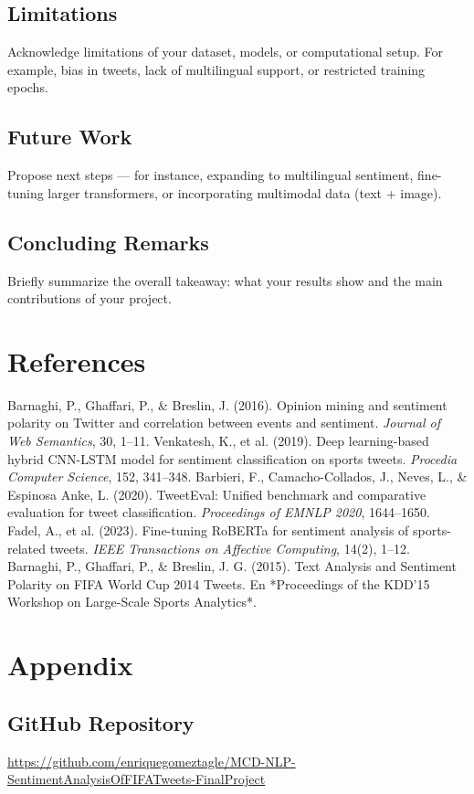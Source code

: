 \documentclass[10pt]{article}
\begin{document}
\subsection{Limitations} %
Acknowledge limitations of your dataset, models, or computational setup. For example, bias in tweets, lack of multilingual support, or restricted training epochs.

\subsection{Future Work}
Propose next steps — for instance, expanding to multilingual sentiment, fine-tuning larger transformers, or incorporating multimodal data (text + image).

\subsection{Concluding Remarks}
Briefly summarize the overall takeaway: what your results show and the main contributions of your project.

\section{References}
\begin{thebibliography}{9}
 Barnaghi, P., Ghaffari, P., \& Breslin, J. (2016). Opinion mining and sentiment polarity on Twitter and correlation between events and sentiment. \textit{Journal of Web Semantics}, 30, 1–11.
 Venkatesh, K., et al. (2019). Deep learning-based hybrid CNN-LSTM model for sentiment classification on sports tweets. \textit{Procedia Computer Science}, 152, 341–348.
 Barbieri, F., Camacho-Collados, J., Neves, L., \& Espinosa Anke, L. (2020). TweetEval: Unified benchmark and comparative evaluation for tweet classification. \textit{Proceedings of EMNLP 2020}, 1644–1650.
 Fadel, A., et al. (2023). Fine-tuning RoBERTa for sentiment analysis of sports-related tweets. \textit{IEEE Transactions on Affective Computing}, 14(2), 1–12.
Barnaghi, P., Ghaffari, P., \& Breslin, J. G. (2015). Text Analysis and Sentiment Polarity on FIFA World Cup 2014 Tweets. En *Proceedings of the KDD’15 Workshop on Large-Scale Sports Analytics*.  
\end{thebibliography}
\section{Appendix}
\subsection{GitHub Repository}
\url{https://github.com/enriquegomeztagle/MCD-NLP-SentimentAnalysisOfFIFATweets-FinalProject}
\end{document}
